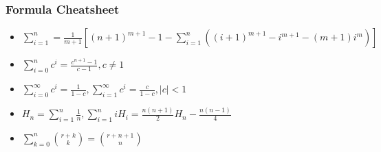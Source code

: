 \subsubsection{Formula Cheatsheet}
\vspace{2.5mm}
\begin{itemize}
    \item $\sum\limits_{i=1}^n = \frac{1}{m+1}[(n+1)^{m+1} - 1 - \sum\limits_{i=1}^n((i+1)^{m+1}-i^{m+1}-(m+1)i^m)]$

    \item $\sum\limits_{i=0}^nc^i = \frac{c^{n+1}-1}{c-1}, c\neq 1$

    \item $\sum\limits_{i=0}^\infty c^i = \frac{1}{1-c}, \sum\limits_{i=1}^\infty c^i = \frac{c}{1-c}, |c|< 1$

    \item $H_n = \sum\limits_{i=1}^n \frac{1}{n}, \sum\limits_{i=1}^n iH_i = \frac{n(n+1)}{2}H_n - \frac{n(n-1)}{4}$

    \item $\sum\limits_{k=0}^n\binom{r+k}{k} =\binom{r+n+1}{n}$
   
\end{itemize}
